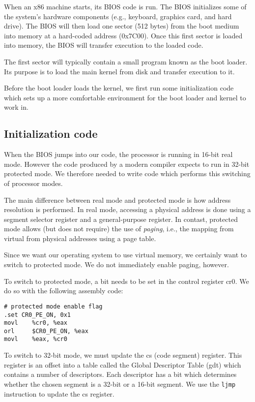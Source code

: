 \documentclass{article}
\begin{document}
When an x86 machine starts, its BIOS code is run. The BIOS initializes some of
the system's hardware components (e.g., keyboard, graphics card, and hard
drive). The BIOS will then load one sector (512 bytes) from the boot medium
into memory at a hard-coded address (0x7C00). Once this first sector is loaded
into memory, the BIOS will transfer execution to the loaded code.

The first sector will typically contain a small program known as the boot
loader. Its purpose is to load the main kernel from disk and transfer
execution to it.

Before the boot loader loads the kernel, we first run some initialization code
which sets up a more comfortable environment for the boot loader and kernel to
work in.



\subsection{Initialization code}
When the BIOS jumps into our code, the processor is running in 16-bit real
mode. However the code produced by a modern compiler expects to run in 32-bit
protected mode. We therefore needed to write code which performs this
switching of processor modes.

The main difference between real mode and protected mode is how address
resolution is performed. In real mode, accessing a physical address is done
using a segment selector register and a general-purpose register. In
contast, protected mode allows (but does not require) the use of
\emph{paging}, i.e., the mapping from virtual from physical addresses using a
page table.

Since we want our operating system to use virtual memory, we certainly want to
switch to protected mode. We do not immediately enable paging, however.

To switch to protected mode, a bit needs to be set in the control register
\gls{cr0}. We do so with the following assembly code:
\begin{verbatim}
# protected mode enable flag
.set CR0_PE_ON, 0x1 
movl    %cr0, %eax
orl     $CR0_PE_ON, %eax
movl    %eax, %cr0
\end{verbatim}

To switch to 32-bit mode, we must update the \gls{cs} (code
segment) register. This register is an offset into a table called the Global
Descriptor Table (\gls{gdt}) which contains a number of descriptors. Each
descriptor has a bit which determines whether the chosen segment is a 32-bit
or a 16-bit segment. We use the \texttt{ljmp} instruction to update the
\gls{cs} register.
\end{document}
